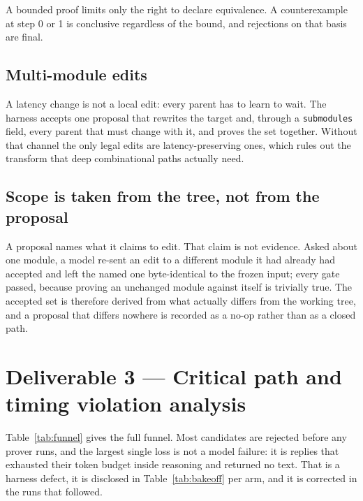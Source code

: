 \documentclass[11pt,a4paper]{article}
\begin{document}


A bounded proof limits only the right to declare equivalence. A counterexample
at step 0 or 1 is conclusive regardless of the bound, and rejections on that
basis are final.

\subsection{Multi-module edits}
\label{sec:multimodule}

A latency change is not a local edit: every parent has to learn to wait. The
harness accepts one proposal that rewrites the target and, through a
\texttt{submodules} field, every parent that must change with it, and proves
the set together. Without that channel the only legal edits are
latency-preserving ones, which rules out the transform that deep combinational
paths actually need.

\subsection{Scope is taken from the tree, not from the proposal}
\label{sec:scope}

A proposal names what it claims to edit. That claim is not evidence. Asked
about one module, a model re-sent an edit to a different module it had already
had accepted and left the named one byte-identical to the frozen input; every
gate passed, because proving an unchanged module against itself is trivially
true. The accepted set is therefore derived from what actually differs from the
working tree, and a proposal that differs nowhere is recorded as a no-op rather
than as a closed path.

\section{Deliverable 3 --- Critical path and timing violation analysis}
\label{sec:d3}



Table~\ref{tab:funnel} gives the full funnel. Most candidates are rejected
before any prover runs, and the largest single loss is not a model failure: it
is replies that exhausted their token budget inside reasoning and returned no
text. That is a harness defect, it is disclosed in
Table~\ref{tab:bakeoff} per arm, and it is corrected in the runs that followed.
\end{document}
